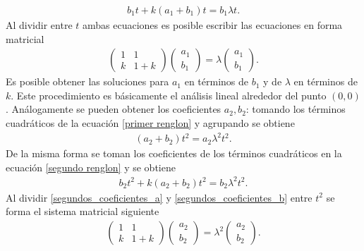 \begin{eqnarray}
b_{1}t+k(a_{1}+b_{1})t=b_{1}\lambda t.
\end{eqnarray}
Al dividir entre $t$ ambas ecuaciones es posible escribir las ecuaciones en forma matricial
\begin{eqnarray}
\begin{pmatrix}
1 & 1\\
k & 1+k
\end{pmatrix}
\begin{pmatrix}
a_{1}\\
b_{1}
\end{pmatrix}=
\lambda \begin{pmatrix}
a_{1}\\
b_{1}
\end{pmatrix}.
\end{eqnarray}
Es posible obtener las soluciones para $a_{1}$ en términos de $b_{1}$ y de $\lambda$ en términos de $k$. Este procedimiento es básicamente el análisis lineal alrededor del punto $(0,0)$. Análogamente se pueden obtener los coeficientes $a_{2},b_{2}$: tomando los términos cuadráticos de la ecuación \ref{primer renglon} y agrupando se obtiene
\begin{eqnarray}
(a_{2}+b_{2})t^{2}=a_{2}\lambda^{2}t^{2}.
\label{segundos_coeficientes_a}
\end{eqnarray}
De la misma forma se toman los coeficientes de los términos cuadráticos en la ecuación \ref{segundo renglon} y se obtiene
\begin{eqnarray}
b_{2}t^{2}+k(a_{2}+b_{2})t^{2}=b_{2}\lambda^{2}t^{2}.
\label{segundos_coeficientes_b}
\end{eqnarray}
Al dividir \ref{segundos_coeficientes_a} y \ref{segundos_coeficientes_b} entre $t^{2}$ se forma el sistema matricial siguiente
\begin{eqnarray}
\begin{pmatrix}
1 & 1\\
k & 1+k
\end{pmatrix}
\begin{pmatrix}
a_{2}\\
b_{2}
\end{pmatrix}=
\lambda^{2} \begin{pmatrix}
a_{2}\\
b_{2}
\end{pmatrix}.
\end{eqnarray}

